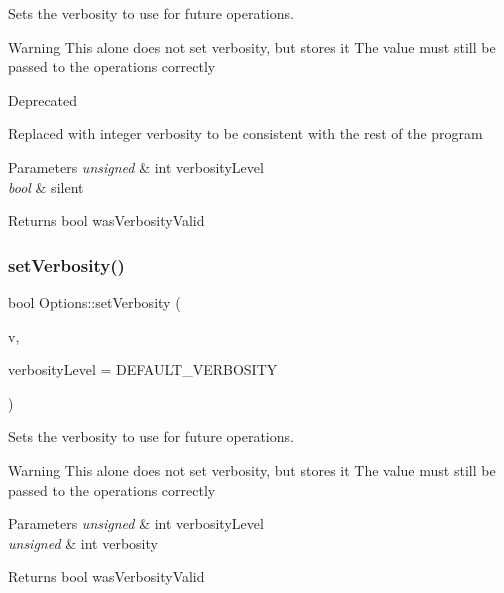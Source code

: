 Sets the verbosity to use for future operations. 

\begin{DoxyWarning}{Warning}
This alone does not set verbosity, but stores it The value must still be passed to the operations correctly
\end{DoxyWarning}
\begin{DoxyRefDesc}{Deprecated}
\item[\mbox{\hyperlink{deprecated__deprecated000006}{Deprecated}}]Replaced with integer verbosity to be consistent with the rest of the program\end{DoxyRefDesc}



\begin{DoxyParams}{Parameters}
{\em unsigned} & int verbosity\+Level \\
\hline
{\em bool} & silent\\
\hline
\end{DoxyParams}
\begin{DoxyReturn}{Returns}
bool was\+Verbosity\+Valid 
\end{DoxyReturn}
\mbox{\label{classOptions_a9e04bb50ae096ddd2485edaffb623f86}} 
\subsubsection{\texorpdfstring{setVerbosity()}{setVerbosity()}\hspace{0.1cm}{\footnotesize\ttfamily [2/4]}}
{\footnotesize\ttfamily bool Options\+::set\+Verbosity (\begin{DoxyParamCaption}\item[{unsigned int}]{v,  }\item[{unsigned int}]{verbosity\+Level = {\ttfamily DEFAULT\+\_\+VERBOSITY} }\end{DoxyParamCaption})}



Sets the verbosity to use for future operations. 

\begin{DoxyWarning}{Warning}
This alone does not set verbosity, but stores it The value must still be passed to the operations correctly
\end{DoxyWarning}

\begin{DoxyParams}{Parameters}
{\em unsigned} & int verbosity\+Level \\
\hline
{\em unsigned} & int verbosity\\
\hline
\end{DoxyParams}
\begin{DoxyReturn}{Returns}
bool was\+Verbosity\+Valid 
\end{DoxyReturn}
\mbox{\label{classOptions_aacc3c77821336b90e6c006896faaa669}} 
